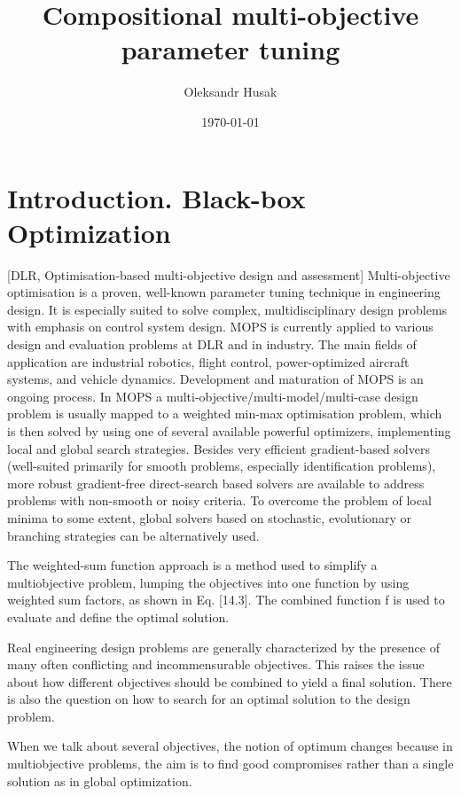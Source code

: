 \documentclass[ms,english]{stthesis}
\title{Compositional multi-objective parameter tuning}
\author{Oleksandr Husak}
\date{\today}
\begin{document}
    \maketitle %
  
    \tableofcontents
  
    \chapter{Introduction. Black-box Optimization}
        [DLR, Optimisation-based multi-objective design and assessment] 
        Multi-objective optimisation is a proven, well-known parameter tuning technique in engineering design. It is especially suited 
        to solve complex, multidisciplinary design problems with emphasis on control system design.
        MOPS is currently applied to various design and evaluation problems at DLR and in industry. The main fields 
        of application are industrial robotics, flight control, power-optimized aircraft systems, and vehicle dynamics. Development and maturation of MOPS is an ongoing process.
        In MOPS a multi-objective/multi-model/multi-case design problem is usually mapped to a weighted min-max optimisation problem, which is then solved by using one of several 
        available powerful optimizers, implementing local and global search strategies. Besides very efficient gradient-based solvers (well-suited primarily for smooth problems, 
        especially identification problems), more robust gradient-free direct-search based solvers are available to address problems with non-smooth or noisy criteria. To overcome the 
        problem of local minima to some extent, global solvers based on stochastic, evolutionary or branching strategies can be alternatively used.

        The weighted-sum function approach is a method used to simplify a multiobjective problem, lumping the objectives into 
        one function by using weighted sum factors, as shown in Eq. [14.3]. The combined function f is used to evaluate and define the optimal solution.

        Real engineering design problems are generally characterized by the presence of many
        often conflicting and incommensurable objectives. This raises the issue about how
        different objectives should be combined to yield a final solution. There is also the
        question on how to search for an optimal solution to the design problem. 

        When we talk about several objectives, the notion of optimum changes because in multiobjective problems, the aim is to find good compromises rather than a single solution as in global optimization.
\end{document}
